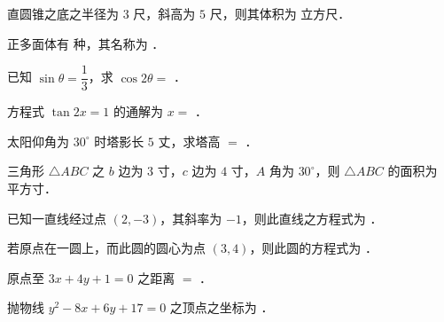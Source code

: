 \begin{question}
直圆锥之底之半径为 $3$ 尺，斜高为 $5$ 尺，则其体积为 \gkblank{} 立方尺．

\end{question}
\begin{question}
正多面体有 \gkblank{} 种，其名称为 \gkblank{}．

\end{question}
\begin{question}
已知 $\sin\theta=\dfrac13$，求 $\cos2\theta=$ \gkblank{}．

\end{question}
\begin{question}
方程式 $\tan2x=1$ 的通解为 $x=$ \gkblank{}．

\end{question}
\begin{question}
太阳仰角为 $30^\circ$ 时塔影长 $5$ 丈，求塔高 $=$ \gkblank{}．

\end{question}
\begin{question}
三角形 $\triangle ABC$ 之 $b$ 边为 $3$ 寸，$c$ 边为 $4$ 寸，$A$ 角为 $30^\circ$，则 $\triangle ABC$ 的面积为 \gkblank{} \mbox{平方寸}．

\end{question}
\begin{question}
已知一直线经过点 $(2,-3)$，其斜率为 $-1$，则此直线之方程式为 \gkblank{}．

\end{question}
\begin{question}
若原点在一圆上，而此圆的圆心为点 $(3,4)$，则此圆的方程式为 \gkblank{}．

\end{question}
\begin{question}
原点至 $3x+4y+1=0$ 之距离 $=$ \gkblank{}．

\end{question}
\begin{question}
抛物线 $y^2-8x+6y+17=0$ 之顶点之坐标为 \gkblank{}．

\par\medskip

\end{question}

